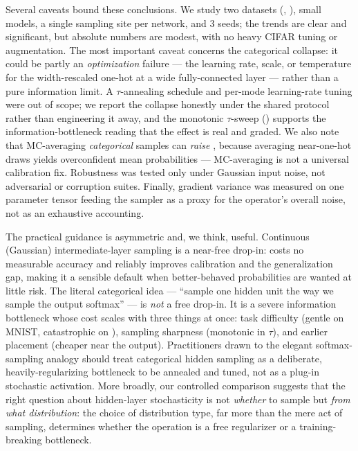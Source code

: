 Several caveats bound these conclusions. We study two datasets (\mnist{}, \cifar{}), small
models, a single sampling site per network, and 3 seeds; the trends are clear and
significant, but absolute numbers are modest, with no heavy CIFAR tuning or augmentation. The
most important caveat concerns the categorical collapse: it could be partly an
\emph{optimization} failure --- the learning rate, scale, or temperature for the
width-rescaled one-hot at a wide fully-connected layer --- rather than a pure information
limit. A $\tau$-annealing schedule and per-mode learning-rate tuning were out of scope; we
report the collapse honestly under the shared protocol rather than engineering it away, and
the monotonic $\tau$-sweep () supports the information-bottleneck reading that
the effect is real and graded. We also note that MC-averaging \emph{categorical} samples can
\emph{raise} \ece{}, because averaging near-one-hot draws yields overconfident mean
probabilities --- MC-averaging is not a universal calibration fix. Robustness was tested only
under Gaussian input noise, not adversarial or corruption suites. Finally, gradient variance
was measured on one parameter tensor feeding the sampler as a proxy for the operator's
overall noise, not as an exhaustive accounting.

The practical guidance is asymmetric and, we think, useful. Continuous (Gaussian)
intermediate-layer sampling is a near-free drop-in: \gaussreparam{} costs no measurable
accuracy and reliably improves calibration and the generalization gap, making it a sensible
default when better-behaved probabilities are wanted at little risk. The literal categorical
idea --- ``sample one hidden unit the way we sample the output softmax'' --- is \emph{not} a
free drop-in. It is a severe information bottleneck whose cost scales with three things at
once: task difficulty (gentle on MNIST, catastrophic on \cifar{}), sampling sharpness
(monotonic in $\tau$), and earlier placement (cheaper near the output). Practitioners drawn
to the elegant softmax-sampling analogy should treat categorical hidden sampling as a
deliberate, heavily-regularizing bottleneck to be annealed and tuned, not as a plug-in
stochastic activation. More broadly, our controlled comparison suggests that the right
question about hidden-layer stochasticity is not \emph{whether} to sample but \emph{from what
distribution}: the choice of distribution type, far more than the mere act of sampling,
determines whether the operation is a free regularizer or a training-breaking bottleneck.
